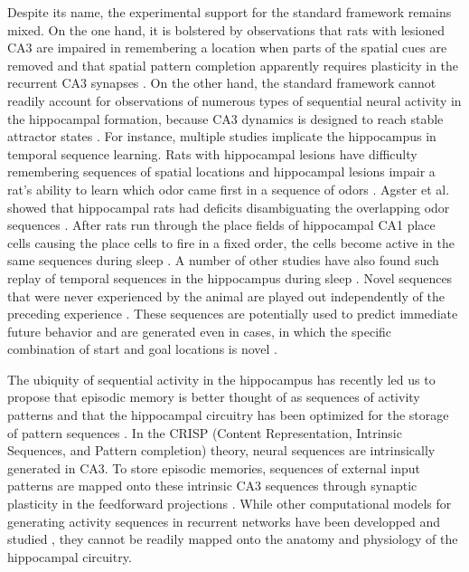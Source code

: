 \documentclass[utf8]{frontiersSCNS} %
\begin{document}
Despite its name, the experimental support for the standard framework remains mixed. On the one hand, it is bolstered by observations that rats with lesioned CA3 are impaired in remembering a location when parts of the spatial cues are removed \citep{gold2005role} and that spatial pattern completion apparently requires plasticity in the recurrent CA3 synapses \citep{nakazawa2002requirement}. On the other hand, the standard framework cannot readily account for observations of numerous types of sequential neural activity in the hippocampal formation, because CA3 dynamics is designed to reach stable attractor states \citep{cheng2013crisp}. 
For instance, multiple studies implicate the hippocampus in temporal sequence learning. Rats with hippocampal lesions have difficulty remembering sequences of spatial locations \citep{chiba1994memory} and hippocampal lesions impair a rat's ability to learn which odor came first in a sequence of odors \citep{fortin2002critical}. Agster et al. showed that hippocampal rats had deficits disambiguating the overlapping odor sequences \citep{agster2002hippocampus}. After rats run through the place fields of hippocampal CA1 place cells causing the place cells to fire in a fixed order, the cells become active in the same sequences during sleep \citep{lee2002memory}. A number of other studies have also found such replay of temporal sequences in the hippocampus during sleep \citep{louie2001temporally, kudrimoti1999reactivation, qin1997memory, skaggs1996replay}. Novel sequences that were never experienced by the animal are played out independently of the preceding experience \citep{gupta2010hippocampal, dragoi2011preplay}. These sequences are potentially used to predict immediate future behavior and are generated even in cases, in which the specific combination of start and goal locations is novel \citep{pfeiffer2013hippocampal}. 

The ubiquity of sequential activity in the hippocampus has recently led us to propose that episodic memory is better thought of as sequences of activity patterns \citep{cheng2016dissociating} and that the hippocampal circuitry has been optimized for the storage of pattern sequences \citep{cheng2013crisp}. 
In the CRISP (Content Representation, Intrinsic Sequences, and Pattern completion) theory, neural sequences are intrinsically generated in CA3. To store episodic memories, sequences of external input patterns are mapped onto these intrinsic CA3 sequences through synaptic plasticity in the feedforward projections \citep[e.g.][]{willshaw1969non}.
While other computational models for generating activity sequences in recurrent networks have been developped and studied \citep{sussillo2009generating, lazar2009sorn, rajan2016recurrent, jaeger2001echo, kropff2007complexity, bayati2015self}, they cannot be readily mapped onto the anatomy and physiology of the hippocampal circuitry.
\end{document}
